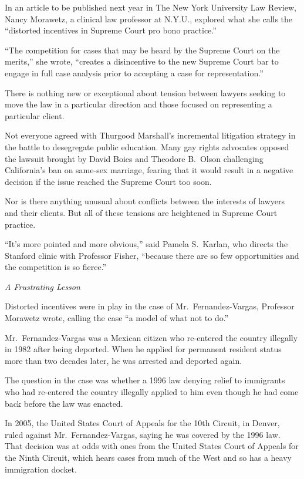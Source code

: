 ﻿\documentclass[12pt]{article}
\begin{document}
In an article to be published next year in The New York University Law Review, Nancy Morawetz, a
clinical law professor at N.Y.U., explored what she calls the ``distorted incentives in Supreme
Court pro bono practice.''

``The competition for cases that may be heard by the Supreme Court on the merits,'' she wrote,
``creates a disincentive to the new Supreme Court bar to engage in full case analysis prior to
accepting a case for representation.''

There is nothing new or exceptional about tension between lawyers seeking to move the law in a
particular direction and those focused on representing a particular client.

Not everyone agreed with Thurgood Marshall's incremental litigation strategy in the battle to
desegregate public education. Many gay rights advocates opposed the lawsuit brought by David Boies
and Theodore B.~Olson challenging California's ban on same-sex marriage, fearing that it would
result in a negative decision if the issue reached the Supreme Court too soon.

Nor is there anything unusual about conflicts between the interests of lawyers and their clients.
But all of these tensions are heightened in Supreme Court practice.

``It's more pointed and more obvious,'' said Pamela S.~Karlan, who directs the Stanford clinic with
Professor Fisher, ``because there are so few opportunities and the competition is so fierce.''

\emph{A Frustrating Lesson}

Distorted incentives were in play in the case of Mr.~Fernandez-Vargas, Professor Morawetz wrote,
calling the case ``a model of what not to do.''

Mr.~Fernandez-Vargas was a Mexican citizen who re-entered the country illegally in 1982 after being
deported. When he applied for permanent resident status more than two decades later, he was arrested
and deported again.

The question in the case was whether a 1996 law denying relief to immigrants who had re-entered the
country illegally applied to him even though he had come back before the law was enacted.

In 2005, the United States Court of Appeals for the 10th Circuit, in Denver, ruled against
Mr.~Fernandez-Vargas, saying he was covered by the 1996 law. That decision was at odds with ones
from the United States Court of Appeals for the Ninth Circuit, which hears cases from much of the
West and so has a heavy immigration docket.
\end{document}
